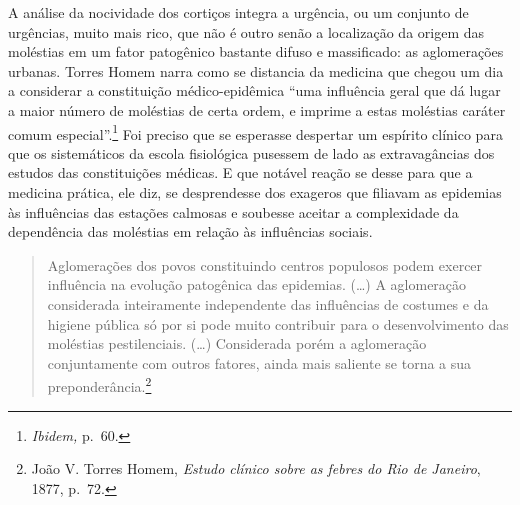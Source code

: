 A análise da nocividade dos cortiços integra a urgência, ou um conjunto
de urgências, muito mais rico, que não é outro senão a localização da
origem das moléstias em um fator patogênico bastante difuso e
massificado: as aglomerações urbanas. Torres Homem narra como se
distancia da medicina que chegou um dia a considerar a constituição
médico-epidêmica ``uma influência geral que dá lugar a maior número de
moléstias de certa ordem, e imprime a estas moléstias caráter comum
especial''.\footnote{\emph{Ibidem,} p.~60.} Foi preciso que se esperasse
despertar um espírito clínico para que os sistemáticos da escola
fisiológica pusessem de lado as extravagâncias dos estudos das
constituições médicas. E que notável reação se desse para que a medicina
prática, ele diz, se desprendesse dos exageros que filiavam as epidemias
às influências das estações calmosas e soubesse aceitar a complexidade
da dependência das moléstias em relação às influências sociais.

\begin{quote}
Aglomerações dos povos constituindo centros populosos podem exercer
influência na evolução patogênica das epidemias. (\ldots{}) A
aglomeração considerada inteiramente independente das influências de
costumes e da higiene pública só por si pode muito contribuir para o
desenvolvimento das moléstias pestilenciais. (\ldots{}) Considerada
porém a aglomeração conjuntamente com outros fatores, ainda mais
saliente se torna a sua preponderância.\footnote{João V. Torres Homem,
  \emph{Estudo clínico sobre as febres do Rio de Janeiro}, 1877, p.~72.}
\end{quote}

